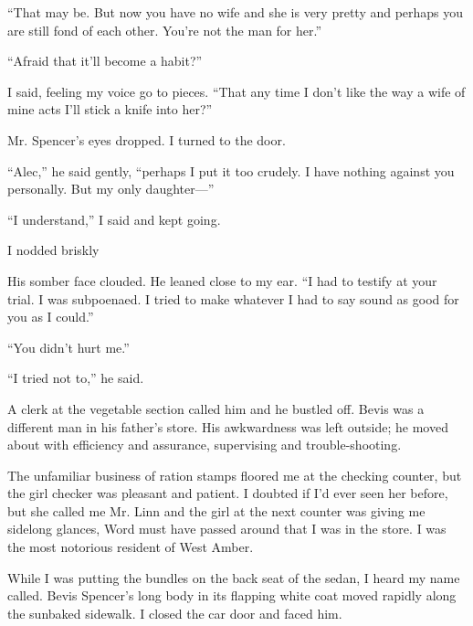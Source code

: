 \documentclass{novel}
\begin{document}
“That may be. But now you have no wife and she is very pretty and perhaps you are still fond of each other. You’re not the man for her.”

“Afraid that it’ll become a habit?”

I said, feeling my voice go to pieces. “That any time I don’t like the way a wife of mine acts I’ll stick a knife into her?”

Mr. Spencer’s eyes dropped. I turned to the door.

“Alec,” he said gently, “perhaps I put it too crudely. I have nothing against you personally. But my only daughter—”

“I understand,” I said and kept going.

\vspace{2\nbs}
\clearpage
\thispagestyle{empty}


\begin{ChapterStart}
\vspace{3\nbs}
\end{ChapterStart}

I nodded briskly

His somber face clouded. He leaned close to my ear. “I had to testify at your trial. I was subpoenaed. I tried to make whatever I had to say sound as good for you as I could.”

“You didn’t hurt me.”

“I tried not to,” he said.

A clerk at the vegetable section called him and he bustled off. Bevis was a different man in his father’s store. His awkwardness was left outside; he moved about with efficiency and assurance, supervising and trouble-shooting.

The unfamiliar business of ration stamps floored me at the checking counter, but the girl checker was pleasant and patient. I doubted if I’d ever seen her before, but she called me Mr. Linn and the girl at the next counter was giving me sidelong glances, Word must have passed around that I was in the store. I was the most notorious resident of West Amber.

While I was putting the bundles on the back seat of the sedan, I heard my name called. Bevis Spencer’s long body in its flapping white coat moved rapidly along the sunbaked sidewalk. I closed the car door and faced him.
\end{document}
